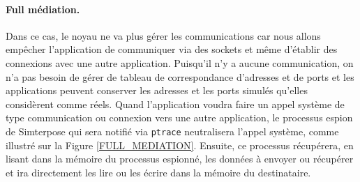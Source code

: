 \paragraph{Full médiation.} 
Dans ce cas, le noyau ne va plus gérer les communications car nous allons
empêcher l'application de communiquer via des sockets et même d'établir des
connexions avec une autre application. Puisqu'il n'y a aucune communication, on
n'a pas besoin de gérer de tableau de correspondance d'adresses et de ports et
les applications peuvent conserver les adresses et les ports simulés qu'elles
considèrent comme réels. Quand l'application voudra faire un appel système de
type communication ou connexion vers une autre application, le processus espion
de Simterpose qui sera notifié via \texttt{ptrace} neutralisera l'appel système,
comme illustré sur la Figure \ref{FULL_MEDIATION}. Ensuite, ce processus
récupérera, en lisant dans la mémoire du processus espionné, les données à
envoyer ou récupérer et ira directement les lire ou les écrire dans la mémoire
du destinataire.

